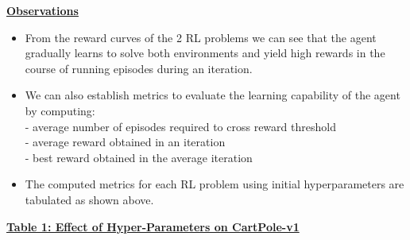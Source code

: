 \documentclass{article}
\begin{document}
    \textbf{\underline{Observations}}\\
    \begin{itemize}
        \item From the reward curves of the 2 RL problems we can see that the agent gradually learns to solve both environments and yield high rewards in the course of running episodes during an iteration. \\
        \item We can also establish metrics to evaluate the learning capability of the agent by computing: \\
        - average number of episodes required to cross reward threshold \\
        - average reward obtained in an iteration \\
        - best reward obtained in the average iteration \\
        \item The computed metrics for each RL problem using initial hyperparameters are tabulated as shown above. \\
    \end{itemize}
    \newpage


    \begin{center}
        \textbf{\underline{Table 1: Effect of Hyper-Parameters on CartPole-v1}}
    \end{center}
\end{document}
